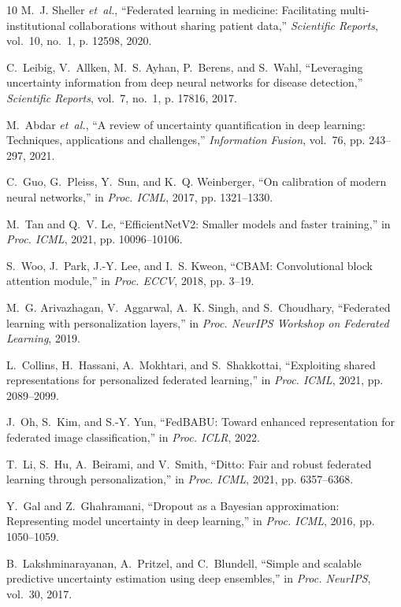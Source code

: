 \documentclass[journal]{IEEEtran}
\begin{document}
\begin{thebibliography}{10}
M.~J. Sheller \textit{et~al.}, ``Federated learning in medicine: Facilitating multi-institutional collaborations without sharing patient data,'' \textit{Scientific Reports}, vol.~10, no.~1, p. 12598, 2020.

C.~Leibig, V.~Allken, M.~S. Ayhan, P.~Berens, and S.~Wahl, ``Leveraging uncertainty information from deep neural networks for disease detection,'' \textit{Scientific Reports}, vol.~7, no.~1, p. 17816, 2017.

M.~Abdar \textit{et~al.}, ``A review of uncertainty quantification in deep learning: Techniques, applications and challenges,'' \textit{Information Fusion}, vol.~76, pp. 243--297, 2021.

C.~Guo, G.~Pleiss, Y.~Sun, and K.~Q. Weinberger, ``On calibration of modern neural networks,'' in \textit{Proc. ICML}, 2017, pp. 1321--1330.

M.~Tan and Q.~V. Le, ``EfficientNetV2: Smaller models and faster training,'' in \textit{Proc. ICML}, 2021, pp. 10096--10106.

S.~Woo, J.~Park, J.-Y. Lee, and I.~S. Kweon, ``CBAM: Convolutional block attention module,'' in \textit{Proc. ECCV}, 2018, pp. 3--19.

M.~G. Arivazhagan, V.~Aggarwal, A.~K. Singh, and S.~Choudhary, ``Federated learning with personalization layers,'' in \textit{Proc. NeurIPS Workshop on Federated Learning}, 2019.

L.~Collins, H.~Hassani, A.~Mokhtari, and S.~Shakkottai, ``Exploiting shared representations for personalized federated learning,'' in \textit{Proc. ICML}, 2021, pp. 2089--2099.

J.~Oh, S.~Kim, and S.-Y. Yun, ``FedBABU: Toward enhanced representation for federated image classification,'' in \textit{Proc. ICLR}, 2022.

T.~Li, S.~Hu, A.~Beirami, and V.~Smith, ``Ditto: Fair and robust federated learning through personalization,'' in \textit{Proc. ICML}, 2021, pp. 6357--6368.

Y.~Gal and Z.~Ghahramani, ``Dropout as a Bayesian approximation: Representing model uncertainty in deep learning,'' in \textit{Proc. ICML}, 2016, pp. 1050--1059.

B.~Lakshminarayanan, A.~Pritzel, and C.~Blundell, ``Simple and scalable predictive uncertainty estimation using deep ensembles,'' in \textit{Proc. NeurIPS}, vol.~30, 2017.


\end{thebibliography}
\end{document}
